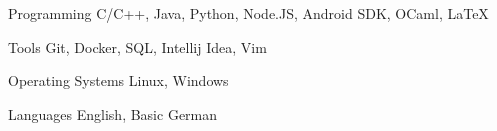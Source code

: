 

\begin{cvskills}

  \cvskill
    {Programming} %
    {C/C++, Java, Python, Node.JS, Android SDK, OCaml, LaTeX} %

  \cvskill
    {Tools} %
    {Git, Docker, SQL, Intellij Idea, Vim} %

  \cvskill
    {Operating Systems} %
    {Linux, Windows} %

  \cvskill
    {Languages} %
    {English, Basic German} %

\end{cvskills}
